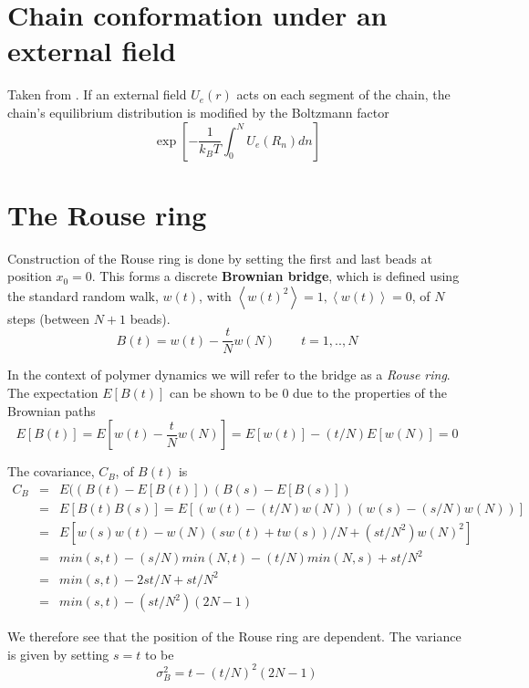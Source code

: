 \documentclass{report}
\begin{document}
\section{Chain conformation under an external field}
Taken from \cite{doi1986theory}. If an external field $U_e(r)$ acts on each segment of the chain, the chain's equilibrium distribution is modified by the Boltzmann factor 
\begin{equation*}
\exp\left[ -\frac{1}{k_BT}\int_0^N U_e(R_n)dn\right]
\end{equation*}


\section{The Rouse ring}\label{section_theRouseRing}
Construction of the Rouse ring is done by setting the first and last beads at position $x_0=0$. This forms a discrete \textbf{Brownian bridge}, which is defined using the standard random walk, $w(t)$, with $\left<w(t)^2\right>=1, \left<w(t)\right>=0$, of $N$ steps (between $N+1$ beads). 
\begin{equation*}
B(t)= w(t)-\frac{t}{N}w(N) \qquad t=1,..,N
\end{equation*} 

In the context of polymer dynamics we will refer to the bridge as a \textit{Rouse ring}. The expectation $E[B(t)]$ can be shown to be 0 due to the properties of the Brownian paths
\begin{equation*}
E[B(t)]=E[w(t)-\frac{t}{N}w(N)]=E[w(t)] -(t/N)E[w(N)]=0
\end{equation*}

The covariance, $C_B$, of $B(t)$ is 
\begin{eqnarray*}
C_{B}  & = & E((B(t)-E[B(t)])(B(s)-E[B(s)])\\
   & = & E[B(t)B(s)]=E[(w(t)-(t/N)w(N))(w(s)-(s/N)w(N))]\\
   & = & E[w(s)w(t)-w(N)(sw(t)+tw(s))/N +(st/N^2)w(N)^2 ]\\
   & = & min(s,t)-(s/N)min(N,t)-(t/N)min(N,s)+st/N^2\\
   & = & min(s,t)-2st/N+st/N^2\\
   & = & min(s,t)-(st/N^2)(2N-1)
\end{eqnarray*}

We therefore see that the position of the Rouse ring are dependent. The variance is given by setting $s=t$ to be 
\begin{equation*}  
\sigma^2_{B}=t-(t/N)^2(2N-1)
\end{equation*}
\end{document}

